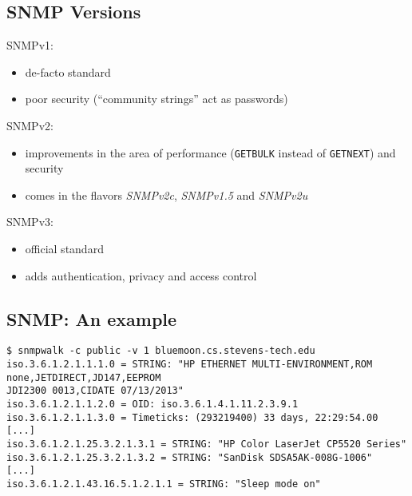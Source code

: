 \documentclass[xga]{xdvislides}
\begin{document}
\subsection{SNMP Versions}
SNMPv1:
\begin{itemize}
	\item de-facto standard
	\item poor security (``community strings'' act as passwords)
\end{itemize}
\vspace{.2in}
SNMPv2:
\begin{itemize}
	\item improvements in the area of performance (\verb+GETBULK+ instead of \verb+GETNEXT+) and security
	\item comes in the flavors {\em SNMPv2c}, {\em SNMPv1.5} and {\em SNMPv2u}
\end{itemize}
\vspace{.2in}
SNMPv3:
\begin{itemize}
	\item official standard
	\item adds authentication, privacy and access control
\end{itemize}

\subsection{SNMP: An example}
\smallish
\begin{verbatim}
$ snmpwalk -c public -v 1 bluemoon.cs.stevens-tech.edu
iso.3.6.1.2.1.1.1.0 = STRING: "HP ETHERNET MULTI-ENVIRONMENT,ROM none,JETDIRECT,JD147,EEPROM
JDI2300 0013,CIDATE 07/13/2013"
iso.3.6.1.2.1.1.2.0 = OID: iso.3.6.1.4.1.11.2.3.9.1
iso.3.6.1.2.1.1.3.0 = Timeticks: (293219400) 33 days, 22:29:54.00
[...]
iso.3.6.1.2.1.25.3.2.1.3.1 = STRING: "HP Color LaserJet CP5520 Series"
iso.3.6.1.2.1.25.3.2.1.3.2 = STRING: "SanDisk SDSA5AK-008G-1006"
[...]
iso.3.6.1.2.1.43.16.5.1.2.1.1 = STRING: "Sleep mode on"
\end{verbatim}
\end{document}
